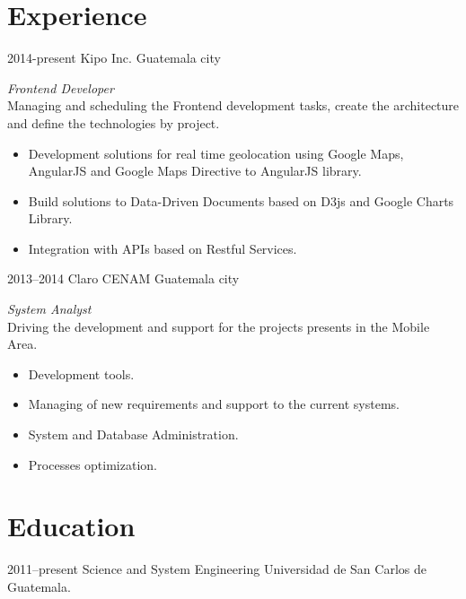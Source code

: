 \documentclass[]{friggeri-cv} %
\begin{document}
\section{Experience}
\begin{entrylist}
\entry
	{2014-present}
	{Kipo Inc.}
	{Guatemala city}
	{\emph{Frontend Developer} \\
	Managing and scheduling the Frontend development tasks, create the architecture and define the technologies by project.
	\begin{itemize}
		\item Development solutions for real time geolocation using Google Maps, AngularJS and Google Maps Directive to AngularJS library.
		\item Build solutions to Data-Driven Documents based on D3js and Google Charts Library.
		\item Integration with APIs based on Restful Services.
	\end{itemize}
	
	}
	
\entry
	{2013--2014}
	{Claro CENAM}
	{Guatemala city}
	{\emph{System Analyst} \\
	Driving the development and support for the projects presents in the Mobile Area.
	\begin{itemize}
		\item Development tools.
		\item Managing of new requirements and support to the current systems.
		\item System and Database Administration.
		\item Processes optimization.
		
	\end{itemize}
	
	}

\end{entrylist}


\section{Education}

\begin{entrylist}
\entry
{2011--present}
{Science and System Engineering}
{Universidad de San Carlos de Guatemala.}
{}
\end{entrylist}
\end{document}
